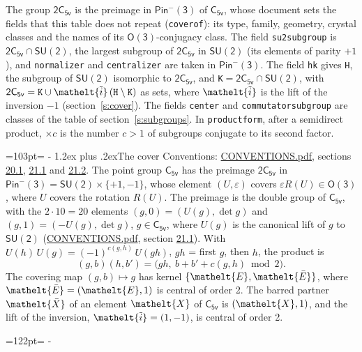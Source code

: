 \documentclass[10pt,a4paper]{article}
\makeatletter
\renewcommand\section{\@startsection{section}{1}{\z@}{-3ex plus -1ex minus -.2ex}%
  {1.2ex plus .2ex}{\normalfont\large\sffamily\bfseries\color{parttitle}}}
\newcommand{\needspace}[1]{\par\penalty-100\begingroup\dimen0=#1\relax\dimen2=\pagegoal
  \advance\dimen2-\pagetotal\ifdim\dimen0>\dimen2\relax\ifdim\dimen2>0pt\vfil\break\fi\fi
  \endgroup}
\numberwithin{equation}{section}
\newcommand{\eltfont}[1]{{\let\sigma\eltsigma\mathelt{#1}}}
\newcommand{\grp}[1]{\mathsf{#1}}
\newcommand{\elt}[1]{\eltfont{#1}}
\newcommand{\dirprod}{\times}
\newcommand{\barred}[1]{\bar{#1}}
\newcommand{\lift}[1]{\tilde{#1}}
\makeatother
\begin{document}
\leavevmode\label{n:element.inversion}\label{n:group.preimage}The group $\grp{2C_{5v}}$ is the preimage in $\grp{Pin^{-}(3)}$ of \href{../../../rotation/data/pdf/C5v.pdf}{$\grp{C_{5v}}$}, whose document sets the fields that this table does not repeat (\texttt{coverof}): its type, family, geometry, crystal classes and the names of its \href{../../../rotation/data/pdf/O3.pdf}{$\grp{O(3)}$}-conjugacy class. The field \texttt{su2subgroup} is $\grp{2C_{5v}} \cap \grp{SU(2)}$, the largest subgroup of $\grp{2C_{5v}}$ in $\grp{SU(2)}$ (its elements of parity $+1$), and \texttt{normalizer} and \texttt{centralizer} are taken in $\grp{Pin^{-}(3)}$. The field \texttt{hk} gives \texttt{H}, the subgroup of $\grp{SU(2)}$ isomorphic to $\grp{2C_{5v}}$, and \texttt{K}${} = \grp{2C_{5v}} \cap \grp{SU(2)}$, with $\grp{2C_{5v}} = \texttt{K} \cup \elt{\lift{i}}\,(\texttt{H} \setminus \texttt{K})$ as sets, where $\elt{\lift{i}}$ is the lift of the inversion $-1$ (section~\ref{s:cover}). The fields \texttt{center} and \texttt{commutatorsubgroup} are classes of the table of section~\ref{s:subgroups}.
\leavevmode\label{n:index.conjugates.c}In \texttt{productform}, after a semidirect product, ${\times}c$ is the number $c > 1$ of subgroups conjugate to its second factor.
\needspace{103pt}
\section{The cover}\label{s:cover}
Conventions: \href{../../CONVENTIONS.pdf}{CONVENTIONS.pdf}, sections \href{../../CONVENTIONS.pdf\#conv.20.1}{20.1}, \href{../../CONVENTIONS.pdf\#conv.21.1}{21.1} and \href{../../CONVENTIONS.pdf\#conv.21.2}{21.2}.
\leavevmode\label{n:group.pin.minus}\label{n:group.su2}\label{n:local.pin.sign}\label{n:matrix.covered}\label{n:matrix.lift.su2}\label{n:index.bar}The point group $\grp{C_{5v}}$ has the preimage $\grp{2C_{5v}}$ in $\grp{Pin^{-}(3)} = \grp{SU(2)} \dirprod \{+1, -1\}$, whose element $(U, \varepsilon)$ covers $\varepsilon R(U) \in \grp{O(3)}$, where $U$ covers the rotation $R(U)$. The preimage is the double group of $\grp{C_{5v}}$, with the $2 \cdot 10 = 20$ elements $(g, 0) = (U(g), \det g)$ and $(g, 1) = (-U(g), \det g)$, $g \in \grp{C_{5v}}$, where $U(g)$ is the canonical lift of $g$ to $\grp{SU(2)}$ (\href{../../CONVENTIONS.pdf}{CONVENTIONS.pdf}, section \href{../../CONVENTIONS.pdf\#conv.21.1}{21.1}). \label{n:function.cocycle}With $U(h)\,U(g) = (-1)^{c(g,h)}\,U(gh)$, $gh$ = first $g$, then $h$, the product is
\begin{equation}\label{e:product}(g, b)(h, b') = \bigl(gh,\ b + b' + c(g, h) \bmod 2\bigr).\end{equation}
\leavevmode\label{n:mark.bar}The covering map $(g, b) \mapsto g$ has kernel $\{\elt{E}, \elt{\barred{E}}\}$, where $\elt{\barred{E}} = (\elt{E}, 1)$ is central of order 2. \label{n:element.named}\label{n:mark.lift}The barred partner $\elt{\barred{X}}$ of an element $\elt{X}$ of $\grp{C_{5v}}$ is $(\elt{X}, 1)$, and the lift of the inversion, $\elt{\lift{i}} = (1, -1)$, is central of order 2.
\needspace{122pt}
\end{document}
